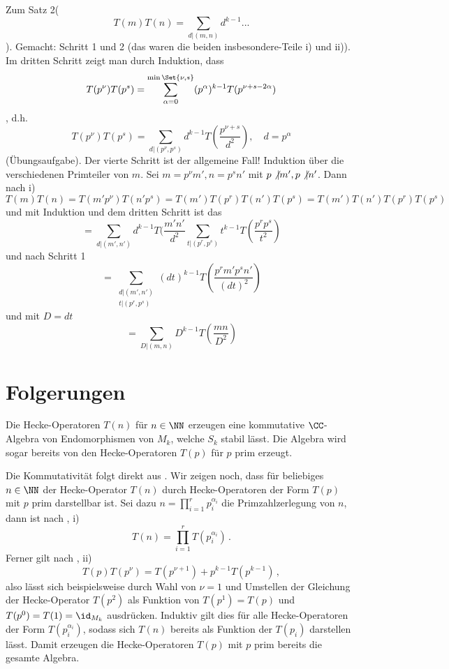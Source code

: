 Zum Satz 2(
\[
T(m)T(n) = \sum_{d \vert (m,n)} d^{k-1} ...
\]
). Gemacht: Schritt 1 und 2 (das waren die beiden insbesondere-Teile i) und ii)). Im dritten Schritt zeigt man durch Induktion, dass 
\[
T(p^\nu) T(p^s) = \sum_{\alpha = 0}^{\min \Set {\nu, s}} (p^\alpha)^{k-1} T(p^{\nu + s - 2\alpha})
\], d.h.
\[
T(p^\nu) T(p^s) = \sum_{d \vert (p^\nu, p^s)} d^{k-1} T(\frac{p^{\nu + s}}{d^2}), \quad d = p^\alpha
\] (Übungsaufgabe).
Der vierte Schritt ist der allgemeine Fall! Induktion über die verschiedenen Primteiler von $m$. Sei $m = p^\nu m', n = p^s n'$ mit $p \not \vert m', p \not \vert n'$. Dann nach i)
\[
T(m)T(n) = T(m'p^\nu) T(n'p^s) = T(m')T(p^r)T(n')T(p^s) = T(m') T(n') T(p^r) T(p^s)
\]
und mit Induktion und dem dritten Schritt ist das
\[
= \sum_{d \vert (m',n')} d^{k-1} T(\frac {m'n'}{d^2} \sum_{t \vert (p^r, p^s)} t^{k-1} T(\frac{p^rp^s}{t^2}) 
\]
und nach Schritt 1
\[
= \sum_{\substack{d \vert (m',n')\\t \vert (p^r, p^s)}} (dt)^{k-1} T(\frac {p^rm'p^sn'}{(dt)^2})
\]
und mit $D = dt$
\[
= \sum_{D \vert (m,n)} D^{k-1} T(\frac {mn}{D^2})
\]

\section{Folgerungen}

\begin{satz}
Die Hecke-Operatoren $T(n)$ für $n \in \NN$ erzeugen eine kommutative $\CC$-Algebra von Endomorphismen von $M_k$, welche $S_k$ stabil lässt. Die Algebra wird sogar bereits von den Hecke-Operatoren $T(p)$ für $p$ prim erzeugt.
\end{satz}

\begin{bewe}
Die Kommutativität folgt direkt aus . Wir zeigen noch, dass für beliebiges $n \in \NN$ der Hecke-Operator $T(n)$ durch Hecke-Operatoren der Form $T(p)$ mit $p$ prim darstellbar ist. Sei dazu $n = \prod_{i=1}^{r} p_i^{\alpha_i}$ die Primzahlzerlegung von $n$, dann ist nach , i)
\[
T(n) = \prod_{i=1}^{r} T(p_i^{\alpha_i})
\,.
\]
Ferner gilt nach , ii)
\[
T(p) T(p^\nu) = T(p^{\nu+1}) + p^{k-1} T(p^{k-1})
\,,
\]
also lässt sich beispielsweise durch Wahl von $\nu = 1$ und Umstellen der Gleichung der Hecke-Operator $T(p^2)$ als Funktion von $T(p^1) = T(p)$ und $T(p^0) = T(1) = \id_{M_k}$ ausdrücken. Induktiv gilt dies für alle Hecke-Operatoren der Form $T(p_i^{\alpha_i})$, sodass sich $T(n)$ bereits als Funktion der $T(p_i)$ darstellen lässt. Damit erzeugen die Hecke-Operatoren $T(p)$ mit $p$ prim bereits die gesamte Algebra.
\end{bewe}

